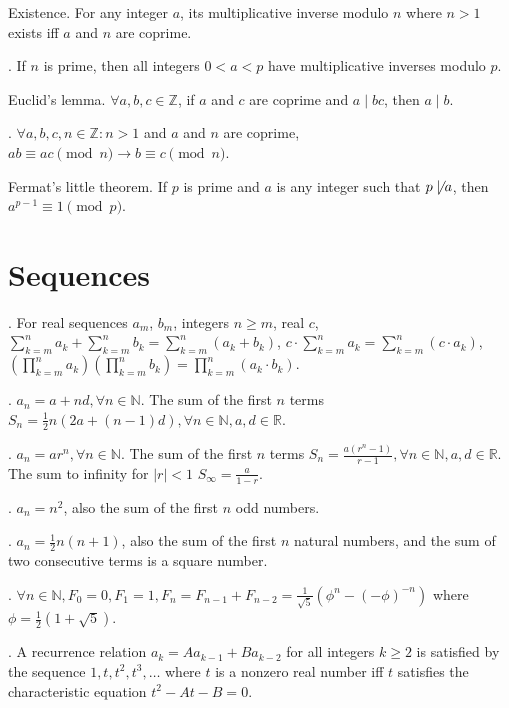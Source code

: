 \documentclass{slnotes}
\begin{document}
 Existence. For any integer \(a\), its multiplicative inverse modulo \(n\) where \(n > 1\) exists iff \(a\) and \(n\) are coprime.

. If \(n\) is prime, then all integers \(0 < a < p\) have multiplicative inverses modulo \(p\).

 Euclid's lemma. \(\forall a,b,c \in \mathbb{Z}\), if \(a\) and \(c\) are coprime and \(a \mid bc\), then \(a \mid b\).

. \(\forall a,b,c,n \in \mathbb{Z} : n > 1\) and \(a\) and \(n\) are coprime, \(ab \equiv ac \pmod n \to b \equiv c \pmod n\).

 Fermat's little theorem. If \(p\) is prime and \(a\) is any integer such that \(p \not\mid a\), then \(a^{p-1} \equiv 1 \pmod p\).

\chapter{Sequences}
. For real sequences \(a_m\), \(b_m\), integers \(n \ge m\), real \(c\), \(\sum^n_{k=m}a_k + \sum^n_{k=m}b_k = \sum^n_{k=m}(a_k+b_k)\), \(c\cdot\sum^n_{k=m}a_k = \sum^n_{k=m}(c\cdot a_k)\), \(\left(\prod^n_{k=m}a_k\right)\left(\prod^n_{k=m}b_k\right) = \prod^n_{k=m}(a_k\cdot b_k)\).

. \(a_n = a + nd, \forall n \in \mathbb{N}\). The sum of the first \(n\) terms \(S_n = \frac{1}{2}n(2a+(n-1)d), \forall n \in \mathbb{N}, a,d \in \mathbb{R}\).

. \(a_n = ar^n, \forall n \in \mathbb{N}\). The sum of the first \(n\) terms \(S_n = \frac{a(r^n-1)}{r-1}, \forall n \in \mathbb{N}, a,d \in \mathbb{R}\). The sum to infinity for \(\lvert r \rvert < 1\) \(S_\infty = \frac{a}{1-r}\).

. \(a_n = n^2\), also the sum of the first \(n\) odd numbers.

. \(a_n = \frac{1}{2}n(n+1)\), also the sum of the first \(n\) natural numbers, and the sum of two consecutive terms is a square number.

. \(\forall n \in \mathbb{N}, F_0 = 0, F_1 = 1, F_n = F_{n-1} + F_{n-2} = \frac{1}{\sqrt 5}(\phi^n - (-\phi)^{-n})\) where \(\phi = \frac{1}{2}(1 + \sqrt5)\).

. A recurrence relation \(a_k = Aa_{k-1} + Ba_{k-2}\) for all integers \(k \ge 2\) is satisfied by the sequence \(1, t, t^2, t^3, \hdots\) where \(t\) is a nonzero real number iff \(t\) satisfies the characteristic equation \(t^2 - At - B = 0\).
\end{document}
